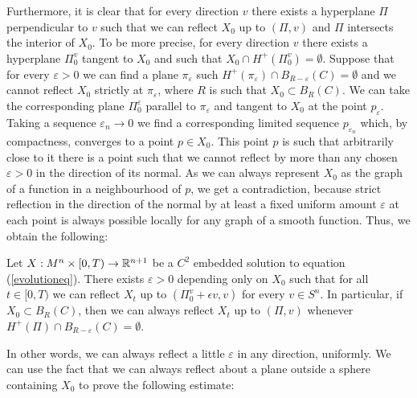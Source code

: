  Furthermore, it is clear that for every direction $v$ there exists a hyperplane $\Pi$ perpendicular to $v$ such that we can reflect $X_0$ up to $(\Pi, v)$ and $\Pi$ intersects the interior of $X_0$. To be more precise, for every direction $v$ there exists a hyperplane $\Pi_0^v$ tangent to $X_0$ and such that $X_0\cap H^+(\Pi_0^v)=\emptyset$. Suppose that for every $\varepsilon>0$ we can find a plane $\pi_\varepsilon$ such $H^+(\pi_\varepsilon)\cap B_{R-\varepsilon}(C)=\emptyset$ and we cannot reflect $X_0$ strictly at $\pi_\varepsilon$, where $R$ is such that $X_0 \subset B_R (C)$. We can take the corresponding plane $\Pi_0^\varepsilon$ parallel to $\pi_\varepsilon$ and tangent to $X_0$ at the point $p_\varepsilon$. Taking a sequence $\varepsilon_n \rightarrow 0$ we find a corresponding limited sequence $p_{\varepsilon_n}$ which, by compactness, converges to a point $p\in X_0$. This point $p$ is such that arbitrarily close to it there is a point such that we cannot reflect by more than any chosen $\varepsilon>0$ in the direction of its normal. As we can always represent $X_0$ as the graph of a function in a neighbourhood of $p$, we get a contradiction, because strict reflection in the direction of the normal by at least a fixed uniform amount $\varepsilon$ at each point is always possible locally for any graph of a smooth function. Thus, we obtain the following:
 
\begin{cor}
	Let $X:M^n\times [0,T) \rightarrow \mathbb{R}^{n+1}$ be a $C^2$ embedded solution to equation (\ref{evolutioneq}). There exists $\varepsilon>0$ depending only on $X_0$ such that for all $t\in[0, T)$ we can reflect $X_t$ up to $(\Pi_0^v +\epsilon v, v)$ for every $v \in S^n$. In particular, if $X_0 \subset B_R (C)$, then we can always reflect $X_t$ up to $(\Pi, v)$ whenever $H^+(\Pi)\cap B_{R-\varepsilon}(C)=\emptyset$.\label{reflect a small bit}
\end{cor}
In other words, we can always reflect a little $\varepsilon$ in any direction, uniformly. We can use the fact that we can always reflect about a plane outside a sphere containing $X_0$ to prove the following estimate:




